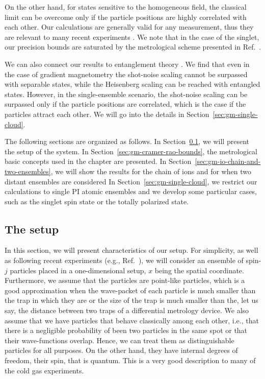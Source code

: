 On the other hand, for states sensitive to the homogeneous field, the classical limit can be overcome only if the particle positions are highly correlated with each other.
Our calculations are generally valid for any measurement, thus they are relevant to many recent experiments \cite{Wasilewski2010,Eckert2006,Wildermuth2006, Wolfgramm2010,Koschorreck2011,Vengalattore2007,Zhou2010,Behbood2013}.
We note that in the case of the singlet, our precision bounds are saturated by the metrological scheme presented in Ref.~\cite{Urizar-Lanz2013}.

We can also connect our results to entanglement theory \cite{Werner1989,Horodecki2009,Guehne2009}.
We find that even in the case of gradient magnetometry the shot-noise scaling cannot be surpassed with separable states, while the Heisenberg scaling can be reached with entangled states.
However, in the single-ensemble scenario, the shot-noise scaling can be surpassed only if the particle positions are correlated, which is the case if the particles attract each other.
We will go into the details in Section~\ref{sec:gm-single-cloud}.

The following sections are organized as follows. In Section~\ref{sec:gm-the-setup}, we will present the setup of the system.
In Section~\ref{sec:gm-cramer-rao-bounds}, the metrological basic concepts used in the chapter are presented.
In Section~\ref{sec:gm-io-chain-and-two-ensembles}, we will show the results for the chain of ions and for when two distant ensembles are considered
In Section~\ref{sec:gm-single-cloud}, we restrict our calculations to single PI atomic ensembles and we develop some particular cases, such as the singlet spin state or the totally polarized state.

\subsection{The setup}
\label{sec:gm-the-setup}

In this section, we will present characteristics of our setup.
For simplicity, as well as following  recent experiments (e.g., Ref.~\cite{Koschorreck2011}), we will consider an ensemble of spin-$j$ particles placed in a one-dimensional setup, $x$ being the spatial coordinate.
Furthermore, we assume that the particles are point-like particles, which is a good approximation when the wave-packet of each particle is much smaller than the trap in which they are or the size of the trap is much smaller than the, let us say, the distance between two traps of a differential metrology device.
We also assume that we have particles that behave classically among each other, i.e., that there is a negligible probability of been two particles in the same spot or that their wave-functions overlap.
Hence, we can treat them as distinguishable particles for all purposes.
On the other hand, they have internal degrees of freedom, their spin, that is quantum. This is a very good description to many of the cold gas experiments.

